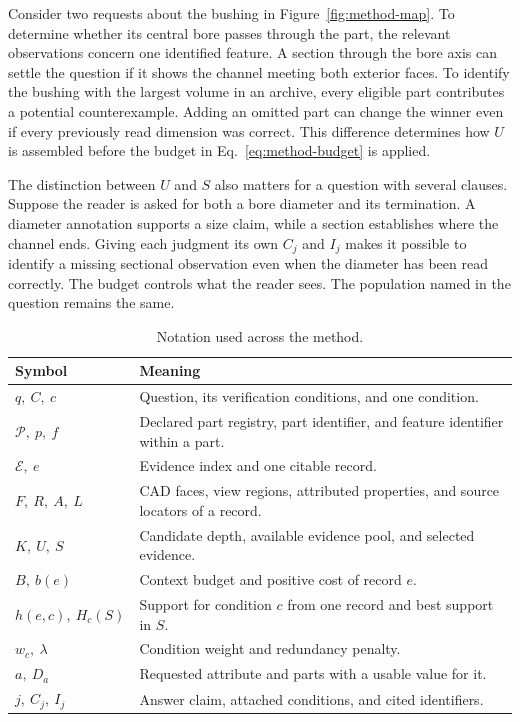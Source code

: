 Consider two requests about the bushing in Figure~\ref{fig:method-map}. To determine whether its central bore passes through the part, the relevant observations concern one identified feature. A section through the bore axis can settle the question if it shows the channel meeting both exterior faces. To identify the bushing with the largest volume in an archive, every eligible part contributes a potential counterexample. Adding an omitted part can change the winner even if every previously read dimension was correct. This difference determines how $U$ is assembled before the budget in Eq.~\eqref{eq:method-budget} is applied.

The distinction between $U$ and $S$ also matters for a question with several clauses. Suppose the reader is asked for both a bore diameter and its termination. A diameter annotation supports a size claim, while a section establishes where the channel ends. Giving each judgment its own $C_j$ and $I_j$ makes it possible to identify a missing sectional observation even when the diameter has been read correctly. The budget controls what the reader sees. The population named in the question remains the same.

\begin{table}[!htbp]
\centering
\caption{Notation used across the method.}
\label{tab:method-notation}
\small\vspace{4pt}
\renewcommand{\arraystretch}{1.08}
\begin{tabular}{@{}l@{\hspace{1em}}p{.67\linewidth}@{}}
\hline
Symbol & Meaning \\ \hline
$q,\ C,\ c$ & Question, its verification conditions, and one condition.\\
$\mathcal P,\ p,\ f$ & Declared part registry, part identifier, and feature identifier within a part.\\
$\mathcal E,\ e$ & Evidence index and one citable record.\\
$F,\ R,\ A,\ L$ & CAD faces, view regions, attributed properties, and source locators of a record.\\
$K,\ U,\ S$ & Candidate depth, available evidence pool, and selected evidence.\\
$B,\ b(e)$ & Context budget and positive cost of record $e$.\\
$h(e,c),\ H_c(S)$ & Support for condition $c$ from one record and best support in $S$.\\
$w_c,\ \lambda$ & Condition weight and redundancy penalty.\\
$a,\ D_a$ & Requested attribute and parts with a usable value for it.\\
$j,\ C_j,\ I_j$ & Answer claim, attached conditions, and cited identifiers.\\
\hline
\end{tabular}
\end{table}


